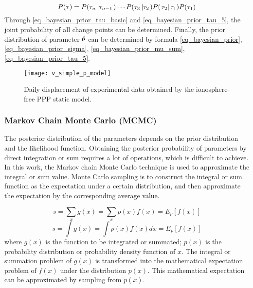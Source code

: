 \documentclass{svjour3}                     %
\begin{document}
\begin{equation}\label{eq_bayesian_prior_tau_5}
P({\bf{\tau }}) = P({\tau _n}\left| {{\tau _{n - 1}}} \right.) \cdots P({\tau _3}\left| {{\tau _2}} \right.)P(\left. {{\tau _2}} \right|{\tau _1})P({\tau _1})
\end{equation}
Through \ref{eq_bayesian_prior_tau_basic} and \ref{eq_bayesian_prior_tau_5}, the joint probability of all change points can be determined. Finally, the prior distribution of parameter ${\bf{\theta }}$ can be determined by formula \ref{eq_bayesian_prior}, \ref{eq_bayesian_prior_sigma}, \ref{eq_bayesian_prior_mu_sum}, \ref{eq_bayesian_prior_tau_5}.
\begin{figure}[H]
	\centering
	\texttt{[image: v\_simple\_p\_model]}
	\caption{Daily displacement of experimental data obtained by the ionosphere-free PPP static model.}
	\label{fig_v_simple_p_model}
\end{figure} 

\subsubsection{Markov Chain Monte Carlo (MCMC)}
The posterior distribution of the parameters depends on the prior distribution and the likelihood function. Obtaining the posterior probability of parameters by direct integration or sum requires a lot of operations, which is difficult to achieve. In this work, the Markov chain Monte Carlo technique is used to approximate the integral or sum value. Monte Carlo sampling is to construct the integral or sum function as the expectation under a certain distribution, and then approximate the expectation by the corresponding average value\citep{goodfellow2016deep}.

\begin{equation}\label{eq_monte_carlo_1}
s =\sum\limits_x g(x)= \sum\limits_x {p(x)f(x) = {E_p}[f(x)]}
\end{equation}
\begin{equation}\label{eq_monte_carlo_2}
s =\int {g(x)}= \int {p(x)f(x)dx}  = {E_p}[f(x)]
\end{equation}
where $g(x)$ is the function to be integrated or summated; $p(x)$ is the probability distribution or probability density function of $x$. The integral or summation problem of $g(x)$ is transformed into the mathematical expectation problem of $f(x)$ under the distribution $p(x)$. This mathematical expectation can be approximated by sampling from $p(x)$.
\end{document}
